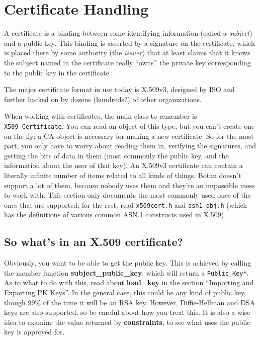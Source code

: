 \documentclass{article}
\newcommand{\filename}[1]{\texttt{#1}}
\newcommand{\function}[1]{\textbf{#1}}
\newcommand{\type}[1]{\texttt{#1}}
\begin{document}
\section{Certificate Handling}

A certificate is a binding between some identifying information
(called a \emph{subject}) and a public key. This binding is asserted
by a signature on the certificate, which is placed there by some
authority (the \emph{issuer}) that at least claims that it knows the
subject named in the certificate really ``owns'' the private key
corresponding to the public key in the certificate.

The major certificate format in use today is X.509v3, designed by ISO and
further hacked on by dozens (hundreds?) of other organizations.

When working with certificates, the main class to remember is
\type{X509\_Certificate}. You can read an object of this type, but you
can't create one on the fly; a CA object is necessary for making a new
certificate. So for the most part, you only have to worry about
reading them in, verifying the signatures, and getting the bits of
data in them (most commonly the public key, and the information about
the user of that key). An X.509v3 certificate can contain a literally
infinite number of items related to all kinds of things. Botan doesn't
support a lot of them, because nobody uses them and they're an
impossible mess to work with. This section only documents the most
commonly used ones of the ones that are supported; for the rest, read
\filename{x509cert.h} and \filename{asn1\_obj.h} (which has the
definitions of various common ASN.1 constructs used in X.509).

\subsection{So what's in an X.509 certificate?}

Obviously, you want to be able to get the public key. This is achieved
by calling the member function \function{subject\_public\_key}, which
will return a \type{Public\_Key*}. As to what to do with this, read
about \function{load\_key} in the section ``Importing and Exporting PK
Keys''. In the general case, this could be any kind of public key,
though 99\% of the time it will be an RSA key. However, Diffie-Hellman
and DSA keys are also supported, so be careful about how you treat
this. It is also a wise idea to examine the value returned by
\function{constraints}, to see what uses the public key is approved
for.
\end{document}
